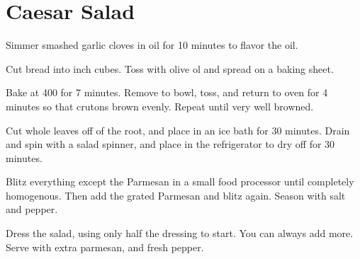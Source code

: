 \section{Caesar Salad}
\begin{recipe}



Simmer smashed garlic cloves in oil for 10 minutes to flavor the oil.

Cut bread into  inch cubes. Toss with olive ol and spread on a baking sheet.

Bake at 400\degree{} for 7 minutes. Remove to bowl, toss, and return to oven for 4 minutes so that crutons brown evenly. Repeat until very well browned. 


Cut whole leaves off of the root, and place in an ice bath for 30 minutes. Drain and spin with a salad spinner, and place in the refrigerator to dry off for 30 minutes.


Blitz everything except the Parmesan in a small food processor until completely homogenous. Then add the grated Parmesan and blitz again. Season with salt and pepper.

Dress the salad, using only half the dressing to start. You can always add more. Serve with extra parmesan, and fresh pepper. 

\end{recipe}

